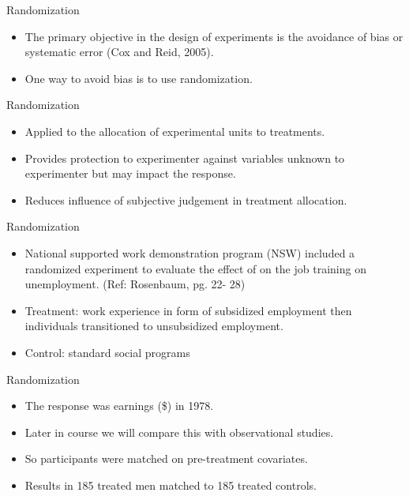 \documentclass[10pt,ignorenonframetext,]{beamer}
\providecommand{\tightlist}{%
\setlength{\itemsep}{0pt}\setlength{\parskip}{0pt}}
\begin{document}
\begin{frame}{Randomization}

\begin{itemize}
\tightlist
\item
  The primary objective in the design of experiments is the avoidance of
  bias or systematic error (Cox and Reid, 2005).
\item
  One way to avoid bias is to use randomization.
\end{itemize}

\end{frame}

\begin{frame}{Randomization}

\begin{itemize}
\tightlist
\item
  Applied to the allocation of experimental units to treatments.
\item
  Provides protection to experimenter against variables unknown to
  experimenter but may impact the response.
\item
  Reduces influence of subjective judgement in treatment allocation.
\end{itemize}

\end{frame}

\begin{frame}{Randomization}

\begin{itemize}
\tightlist
\item
  National supported work demonstration program (NSW) included a
  randomized experiment to evaluate the effect of on the job training on
  unemployment. (Ref: Rosenbaum, pg. 22- 28)
\item
  Treatment: work experience in form of subsidized employment then
  individuals transitioned to unsubsidized employment.
\item
  Control: standard social programs
\end{itemize}

\end{frame}

\begin{frame}{Randomization}

\begin{itemize}
\tightlist
\item
  The response was earnings (\$) in 1978.
\item
  Later in course we will compare this with observational studies.
\item
  So participants were matched on pre-treatment covariates.
\item
  Results in 185 treated men matched to 185 treated controls.
\end{itemize}

\end{frame}
\end{document}
